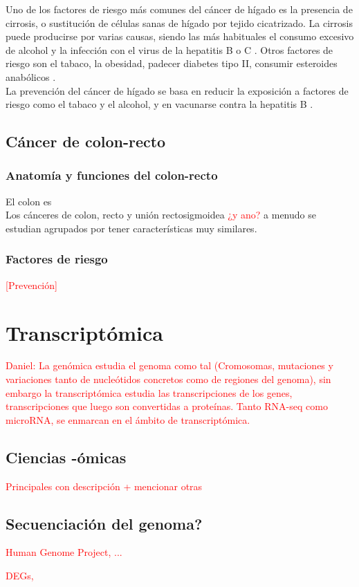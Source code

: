 Uno de los factores de riesgo más comunes del cáncer de hígado es la presencia de cirrosis, o sustitución de células sanas de hígado por tejido cicatrizado. La cirrosis puede producirse por varias causas, siendo las más habituales el consumo excesivo de alcohol y la infección con el virus de la hepatitis B o C \cite{AmericanCancerSociety2019}. Otros factores de riesgo son el tabaco, la obesidad, padecer diabetes tipo II, consumir esteroides anabólicos \cite{AmericanCancerSociety2019, Marrero2005}.\\

La prevención del cáncer de hígado se basa en reducir la exposición a factores de riesgo como el tabaco y el alcohol, y en vacunarse contra la hepatitis B \cite{AmericanCancerSociety2019}.

\subsection{Cáncer de colon-recto}

\subsubsection{Anatomía y funciones del colon-recto}

El colon es \\

Los cánceres de colon, recto y unión rectosigmoidea \textcolor{red}{¿y ano?} a menudo se estudian agrupados por tener características muy similares.

\subsubsection{Factores de riesgo}

\textcolor{red}{[Prevención]}

\section{Transcriptómica}

\textcolor{red}{Daniel: La
	genómica estudia el genoma como tal (Cromosomas, mutaciones y
	variaciones tanto de nucleótidos concretos como de regiones del genoma),
	sin embargo la transcriptómica estudia las transcripciones de los genes,
	transcripciones que luego son convertidas a proteínas. Tanto RNA-seq
	como microRNA, se enmarcan en el ámbito de transcriptómica.}
\subsection{Ciencias -ómicas}

\textcolor{red}{Principales con descripción + mencionar otras}

\subsection{Secuenciación del genoma?}

\textcolor{red}{Human Genome Project, ...}

\textcolor{red}{DEGs, }

